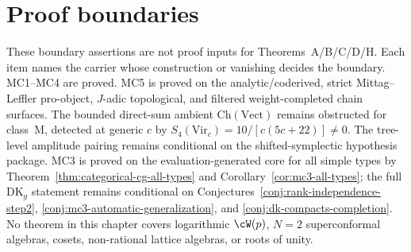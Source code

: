
\section{Proof boundaries}
\label{sec:modular-koszul-theory}

These boundary assertions are not proof inputs for
Theorems~A/B/C/D/H. Each item names the carrier whose construction or
vanishing decides the boundary. MC1--MC4 are proved. MC5 is proved on the
analytic/coderived, strict Mittag--Leffler pro-object, $J$-adic
topological, and filtered weight-completed chain surfaces. The bounded
direct-sum ambient $\mathrm{Ch}(\mathrm{Vect})$ remains obstructed for
class~M, detected at generic $c$ by
$S_4(\mathrm{Vir}_c)=10/[c(5c+22)]\neq 0$. The tree-level amplitude
pairing remains conditional on the shifted-symplectic hypothesis
package.
MC3 is proved on the evaluation-generated core for all simple types by
Theorem~\ref{thm:categorical-cg-all-types} and
Corollary~\ref{cor:mc3-all-types}; the full
$\mathrm{DK}_g$ statement remains conditional on
Conjectures~\ref{conj:rank-independence-step2},
\ref{conj:mc3-automatic-generalization}, and
\ref{conj:dk-compacts-completion}. No theorem in this chapter covers
logarithmic $\cW(p)$, $N=2$ superconformal algebras, cosets,
non-rational lattice algebras, or roots of unity.

